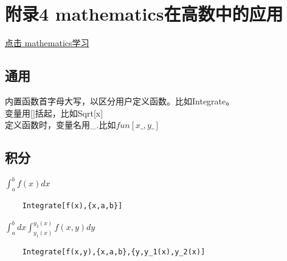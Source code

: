 \documentclass[fleqn]{article}
\begin{document}
\section{附录4 mathematics在高数中的应用}

\href{mathematics_study.html}{点击 mathematics学习}

\subsection{通用}
内置函数首字母大写，以区分用户定义函数。比如Integrate。\\
变量用[]括起，比如Sqrt[x]\\
定义函数时，变量名用\_.比如$fun[x\_,y\_]$\\

\subsection{积分}
$\int_a^b f(x)dx$
\begin{verbatim}
	Integrate[f(x),{x,a,b}]
\end{verbatim}
$\int_a^b dx\int_{y_1(x)}^{y_2(x)}f(x,y)dy$
\begin{verbatim}
	Integrate[f(x,y),{x,a,b},{y,y_1(x),y_2(x)]
\end{verbatim}
\end{document}
